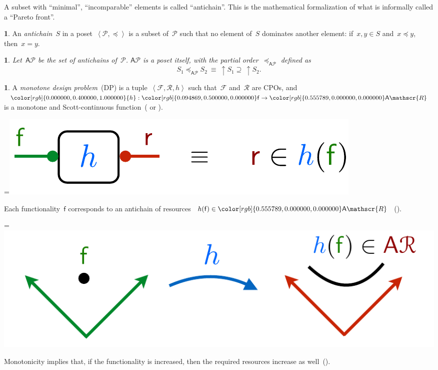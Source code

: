 \documentclass[twocolumn,english]{IEEEconf}
\theoremstyle{plain}
\theoremstyle{definition}
\theoremstyle{definition}
\newtheorem{defn}[thm]{\protect\definitionname}
\theoremstyle{plain}
\newtheorem{lem}[thm]{\protect\lemmaname}
\newcommand{\aword}[1]{\mathsf{#1}}
\newcommand{\vmath}[1]{\aword{#1}}
\newcommand{\posleq}{\preceq}
\newcommand{\posA}{\mathcal{P}}
\newcommand{\antichains}{\vmath{A}}
\newcommand{\ftor}{{h}}
\newcommand{\funsp}{\mathscr{F}}
\newcommand{\fun}{\vmath{f}}
\newcommand{\ressp}{\mathscr{R}}
\newcommand{\Aressp}{{\antichains\ressp}}
\newcommand{\colR}{\color[rgb]{0.555789,0.000000,0.000000}}
\newcommand{\colF}{\color[rgb]{0.094869,0.500000,0.000000}}
\newcommand{\colH}{\color[rgb]{0.000000,0.400000,1.000000}}
\newcommand*{\vcenteredhbox}[1]{\begingroup
\setbox0=\hbox{#1}\parbox{\wd0}{\box0}\endgroup}
\newcommand{\captionsideleft}[2]{
    \medskip
    \begin{minipage}{1.8cm}{
        \hfill
        \protect\captionof{figure}{#1}}\end{minipage}
    \begin{minipage}{6.6cm}
    
    \vcenteredhbox{{#2}}
    \hfill
    \end{minipage}
    \medskip
}
\renewcommand{\Aressp}{{\colR\antichains\ressp}}
\providecommand{\definitionname}{Definition}
\providecommand{\lemmaname}{Lemma}
\begin{document}
A subset with ``minimal'', ``incomparable'' elements is called
``antichain''. This is the mathematical formalization of what is
informally called a ``Pareto front''. 


\begin{defn}
An \emph{antichain}~$S$ in a poset~$\left\langle \posA,\posleq\right\rangle $
is a subset of~$\posA$ such that no element of~$S$ dominates another
element: if~$x,y\in S$ and~$x\posleq y$, then~$x=y$. 
\end{defn}
\begin{lem}
Let~$\antichains\posA$ be the set of antichains of~$\posA$. $\antichains\posA$
is a poset itself, with the partial order~$\posleq_{\antichains\posA}$
defined as
\begin{equation}
S_{1}\posleq_{\antichains\posA}S_{2}\ \equiv\ \uparrow S_{1}\supseteq\,\uparrow S_{2}.\label{eq:orderantichains}
\end{equation}
\end{lem}
\begin{defn}
\label{def:A-monotone-design}A\emph{ monotone design problem~}(DP)
is a tuple~$\left\langle \funsp,\ressp,\ftor\right\rangle $ such
that~$\funsp$ and~$\ressp$ are CPOs, and~${\colH\ftor}:{\colF\fun}\rightarrow{\colR\antichains\ressp}$
is a monotone and Scott-continuous function~(\cite{gierz03continuous}
or \cite[Definition 11]{censi16codesign_sep16}).
\end{defn}
\captionsideleft{}{\includegraphics[scale=0.33]{unc_ftor}}

\noindent Each functionality~$\fun$ corresponds to an antichain
of resources~$\ftor(\fun)\in\Aressp$~(). 

\captionsideleft{\label{fig:antichain}}{\includegraphics[scale=0.33]{unc_ftorgraph}}

\noindent Monotonicity implies that, if the functionality is increased,
then the required resources increase as well~().
\end{document}
